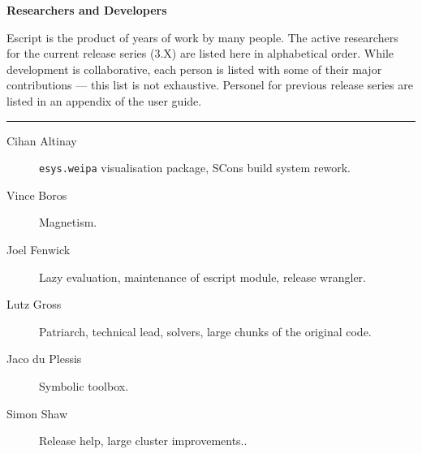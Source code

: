 \vbox{}
\vfill
\begin{center}
\textbf{\Large Researchers and Developers}
\vspace{0.5cm}

Escript is the product of years of work by many people.
The active researchers for the current release series (3.X) are listed here in alphabetical order.
While development is collaborative, each person is listed with some of their major contributions --- this list is not exhaustive.
Personel for previous release series are listed in an appendix of the user guide.

\vspace{1cm}
\hrule
\vspace{1cm}
\begin{description}
\item[Cihan Altinay] \texttt{esys.weipa} visualisation package, SCons build system rework.
\item[Vince Boros] Magnetism.
\item[Joel Fenwick] Lazy evaluation, maintenance of escript module, release wrangler.
\item[Lutz Gross] Patriarch, technical lead, solvers, large chunks of the original code.
\item[Jaco du Plessis] Symbolic toolbox.
\item[Simon Shaw] Release help, large cluster improvements..
\end{description}
\end{center}
\vfill
\pagebreak

